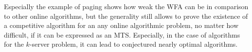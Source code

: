 \documentclass[10pt]{amsart}
\theoremstyle{definition}
\theoremstyle{remark}
\begin{document}
    Especially the example of paging shows how weak the WFA can be in comparison to other online algorithms, but the generality still allows to prove the existence of a competitive algorithm for an any online algorithmic problem, no matter how difficult, if it can be expressed as an MTS. Especially, in the case of algorithms for the \(k\)-server problem, it can lead to conjectured nearly optimal algorithms.

    \printbibliography{}
\end{document}
